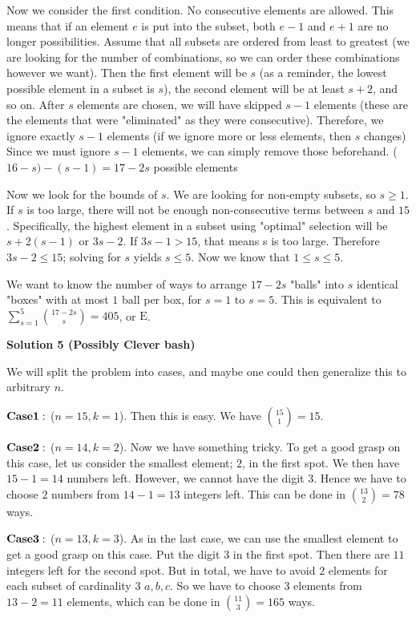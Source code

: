 \begin{enumerate}
 Now we consider the first condition. No consecutive elements are allowed. This means that if an element $e$ is put into the subset, both $e-1$ and $e+1$ are no longer possibilities. Assume that all subsets are ordered from least to greatest (we are looking for the number of combinations, so we can order these combinations however we want). Then the first element will be $s$ (as a reminder, the lowest possible element in a subset is $s$), the second element will be at least $s+2$, and so on. After $s$ elements are chosen, we will have skipped $s-1$ elements (these are the elements that were "eliminated" as they were consecutive). Therefore, we ignore exactly $s-1$ elements (if we ignore more or less elements, then $s$ changes) Since we must ignore $s-1$ elements, we can simply remove those beforehand. ($16-s)-(s-1) = 17-2s$ possible elements

 Now we look for the bounds of $s$. We are looking for non-empty subsets, so $s\ge1$. If $s$ is too large, there will not be enough non-consecutive terms between $s$ and $15$. Specifically, the highest element in a subset using "optimal" selection will be $s+2(s-1)$ or $3s-2$. If $3s-1>15$, that means s is too large. Therefore $3s-2\le15$; solving for $s$ yields $s\le5$. Now we know that $1 \le s \le 5$.

 We want to know the number of ways to arrange $17-2s$ "balls" into $s$ identical "boxes" with at most $1$ ball per box, for $s=1$ to $s=5$. This is equivalent to $\sum_{s=1}^{5}{17-2s \choose s} = 405$, or $\boxed{\text{E}}$.

 



\textbf{Solution 5 (Possibly Clever bash)}

We will split the problem into cases, and maybe one could then generalize this to arbitrary $n$. 

 $\bold { Case 1}:$ ($n=15, k=1$). Then this is easy. We have $\binom{15}{1}=15$.

 $\bold{Case 2}:$ ($n=14, k=2$). Now we have something tricky. To get a good grasp on this case, let us consider the smallest element; $2$, in the first spot. We then have $15-1=14$ numbers left. However, we cannot have the digit $3$. Hence we have to choose $2$ numbers from $14-1=13$ integers left. This can be done in $\binom{13}{2}=78$ ways.

 $\bold{Case 3}:$ ($n=13, k=3$). As in the last case, we can use the smallest element to get a good grasp on this case. Put the digit $3$ in the first spot. Then there are $11$ integers left for the second spot. But in total, we have to avoid $2$ elements for each subset of cardinality $3$ ${a,b,c}$. So we have to choose $3$ elements from $13-2=11$ elements, which can be done in $\binom{11}{3}=165$ ways. 


\end{enumerate}
